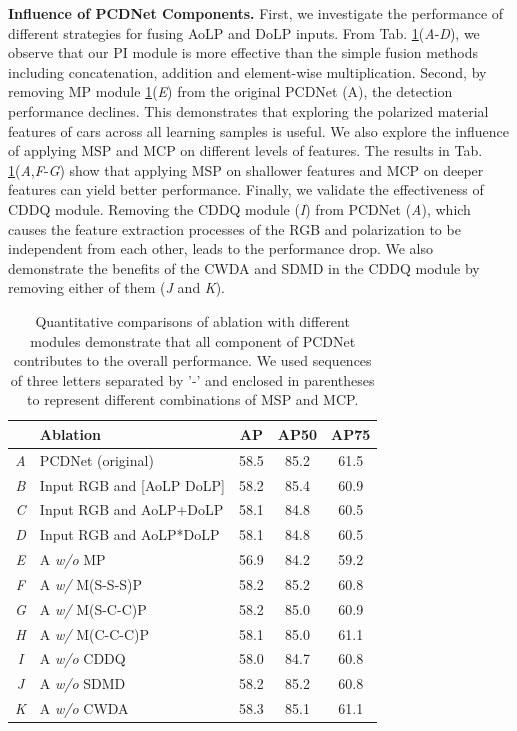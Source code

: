 \textbf{Influence of PCDNet Components.}
First, we investigate the performance of different strategies for fusing AoLP and DoLP inputs. From Tab. \ref{tab:abl_module}(\textit{A}-\textit{D}), we observe that our PI module is more effective than the simple fusion methods including concatenation, addition and element-wise multiplication.
Second, by removing MP module \ref{tab:abl_module}(\textit{E}) from the original PCDNet (A), the detection performance declines. This demonstrates that exploring the polarized material features of cars across all learning samples is useful. We also explore the influence of applying MSP and MCP on different levels of features. The results in Tab. \ref{tab:abl_module}(\textit{A},\textit{F}-\textit{G}) show that applying MSP on shallower features and MCP on deeper features can yield better performance.
Finally, we validate the effectiveness of CDDQ module.
Removing the CDDQ module (\textit{I}) from PCDNet (\textit{A}), which causes the feature extraction processes of the RGB and polarization to be independent from each other, leads to the performance drop. We also demonstrate the benefits of the CWDA and SDMD in the CDDQ module by removing either of them (\textit{J} and \textit{K}). 

\begin{table}[t]
\small
\centering
\caption{Quantitative comparisons of ablation with different modules demonstrate that all component of PCDNet contributes to the overall performance. We used sequences of three letters separated by '-' and enclosed in parentheses to represent different combinations of MSP and MCP.}
\begin{tabular}{clccc}
\hline\hline
	&	Ablation	&	AP	&	AP50	&	AP75	\\
 \hline
\textit{A}	&	PCDNet (original)	&	58.5 	&	85.2 	&	61.5 	\\
\hline
\textit{B}	&	Input RGB and [AoLP DoLP]	&	58.2 	&	85.4 	&	60.9 	\\
\textit{C}	&	Input RGB and AoLP+DoLP	&	58.1 	&	84.8 	&	60.5 	\\
\textit{D}	&	Input RGB and AoLP*DoLP	&	58.1 	&	84.8 	&	60.5 	\\
\hline
\textit{E}	&	A \textit{w/o} MP	&	56.9 	&	84.2 	&	59.2 	\\
\textit{F}	&	A \textit{w/} M(S-S-S)P	&	58.2 	&	85.2 	&	60.8 	\\
\textit{G}	&	A \textit{w/} M(S-C-C)P	&	58.2 	&	85.0 	&	60.9 	\\
\textit{H}	&	A \textit{w/} M(C-C-C)P	&	58.1 	&	85.0 	&	61.1 	\\
\hline
\textit{I}	&	A \textit{w/o} CDDQ	&	58.0 	&	84.7 	&	60.8 	\\
\textit{J}	&	A \textit{w/o} SDMD	&	58.2 	&	85.2 	&	60.8 	\\
\textit{K}	&	A \textit{w/o} CWDA	&	58.3 	&	85.1 	&	61.1 	\\
\hline\hline
\end{tabular}
\label{tab:abl_module}
\end{table}

